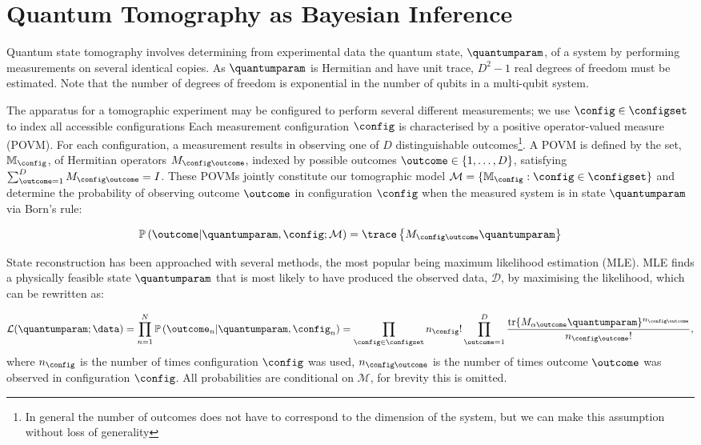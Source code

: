 \section{Quantum Tomography as Bayesian Inference}

Quantum state tomography involves determining from experimental data the quantum state, $\quantumparam$, of a system by performing measurements on several identical copies. As $\quantumparam$ is Hermitian and have unit trace, $D^2-1$ real degrees of freedom must be estimated. Note that the number of degrees of freedom is exponential in the number of qubits in a multi-qubit system.

The apparatus for a tomographic experiment may be configured to perform several different measurements; we use $\config\in\configset$ to index all accessible configurations Each measurement configuration $\config$ is characterised by a positive operator-valued measure (POVM). For each configuration, a measurement results in observing one of $D$ distinguishable outcomes\footnote{In general the number of outcomes does not have to correspond to the dimension of the system, but we can make this assumption without loss of generality }. A POVM is defined by the set, $\mathbb{M}_{\config}$, of Hermitian operators $M_{\config\outcome}$, indexed by possible outcomes $\outcome\in\{1,\ldots,D\}$, satisfying $\sum_{\outcome=1}^{D} M_{\config\outcome} = I$. These POVMs jointly constitute our tomographic model $\mathcal{M}=\{\mathbb{M}_{\config}:\config\in\configset\}$ and determine the probability of observing outcome $\outcome$ in configuration $\config$ when the measured system is in state $\quantumparam$ via Born's rule:

\begin{equation}
	\mathbb{P}\left(\outcome\vert\quantumparam,\config;\mathcal{M}\right) = \trace\left\{M_{\config\outcome}\quantumparam \right\}\label{eqn:quantum_Born}
\end{equation}

State reconstruction has been approached with several methods, the most popular being maximum likelihood estimation (MLE). MLE finds a physically feasible state $\quantumparam$ that is most likely to have produced the observed data, $\mathcal{D}$, by maximising the likelihood, which can be rewritten as:

\begin{equation}
	\label{eqn:quantum_lik}
	\mathcal{L}(\quantumparam;\data)=\prod_{n=1}^{N} \mathbb{P}\left(\outcome_n\vert\quantumparam,\config_n\right) = \prod_{\config \in \configset}n_{\config}!\prod_{\outcome=1}^{D}\frac{\mbox{tr}\{M_{\alpha\outcome}\quantumparam\}^{n_{\config\outcome}}}{n_{\config\outcome}!},
\end{equation}
where $n_{\config}$ is the number of times configuration $\config$ was used, $n_{\config\outcome}$ is the number of times outcome $\outcome$ was observed in configuration $\config$. All probabilities are conditional on $\mathcal{M}$, for brevity this is omitted.


